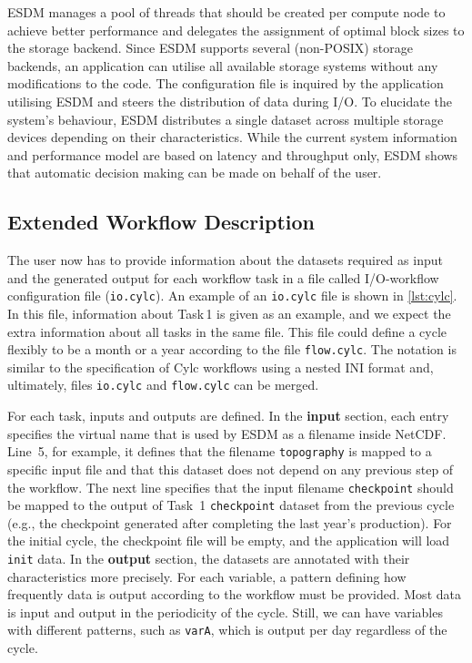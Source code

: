 \documentclass{superfri}
\begin{document}
ESDM manages a pool of threads that should be created per compute node to achieve better performance and delegates the assignment of optimal block sizes to the storage backend.
Since ESDM supports several (non-POSIX) storage backends, an application can utilise all available storage systems without any modifications to the code.
The configuration file is inquired by the application utilising ESDM and steers the distribution of data during I/O.
To elucidate the system's behaviour, ESDM distributes a single dataset across multiple storage devices depending on their characteristics.
While the current system information and performance model are based on latency and throughput only, ESDM shows that automatic decision making can be made on behalf of the user.

\subsection{Extended Workflow Description}

The user now has to provide information about the datasets required as input and the generated output for each workflow task in a file called I/O-workflow configuration file (\texttt{io.cylc}).
An example of an \texttt{io.cylc} file is shown in \cref{lst:cylc}. In this file, information about Task\,1 is given as an example, and we expect the extra information about all tasks in the same file.
This file could define a cycle flexibly to be a month or a year according to the file \texttt{flow.cylc}.
The notation is similar to the specification of Cylc workflows using a nested INI format and, ultimately, files \texttt{io.cylc} and \texttt{flow.cylc} can be merged.

For each task, inputs and outputs are defined.
In the \textbf{input} section, each entry specifies the virtual name that is used by ESDM as a filename inside NetCDF.
Line~5, for example, it defines that the filename \texttt{topography} is mapped to a specific input file and that this dataset does not depend on any previous step of the workflow.
The next line specifies that the input filename \texttt{checkpoint} should be mapped to the output of Task~1 \texttt{checkpoint} dataset from the previous cycle (e.g., the checkpoint generated after completing the last year's production).
For the initial cycle, the checkpoint file will be empty, and the application will load \texttt{init} data.
In the \textbf{output} section, the datasets are annotated with their characteristics more precisely.
For each variable, a pattern defining how frequently data is output according to the workflow must be provided.
Most data is input and output in the periodicity of the cycle. Still, we can have variables with different patterns, such as \texttt{varA}, which is output per day regardless of the cycle.
\end{document}
